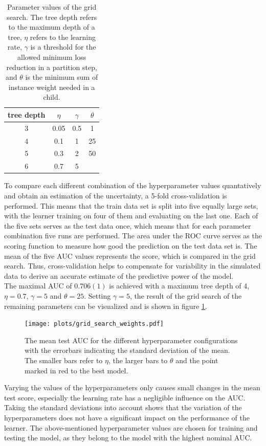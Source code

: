   \begin{table}
    \centering
    \begin{tabular}{c c c c}
      \toprule
      tree depth & $\eta$ & $\gamma$ & $\theta$ \\
      \midrule
      3 & 0.05 & 0.5 & 1  \\
      4 & 0.1  & 1   & 25  \\
      5 & 0.3  & 2 & 50  \\
      6 & 0.7  & 5   &  \\
    \end{tabular}
    \caption{Parameter values of the grid search. The tree depth refers to the maximum depth of a tree, $\eta$ refers to the learning rate,
    $\gamma$ is a threshold for the allowed minimum loss reduction in a partition step, and $\theta$ is the minimum sum of instance weight needed in a child.}
    \label{tab:grid}
  \end{table}
To compare each different combination of the hyperparameter values quantatively and obtain an estimation of the uncertainty, a 5-fold cross-validation is performed. This means that
the train data set is split into five equally
large sets, with the learner training on four of them and evaluating on the last one. Each of the five sets serves as the test data once, which means that for each
parameter combination five runs are performed. The area under the ROC curve serves as the scoring function to measure how good the prediction on the test data set is.
The mean of the five AUC values represents the score, which is compared in the grid search. Thus, cross-validation helps to compensate for variability in the simulated
data to derive an accurate estimate of the predictive power of the model. \\
The maximal AUC of $0.706(1)$ is achieved with a maximum tree depth of 4, $\eta=0.7$, $\gamma=5$ and $\theta=25$. Setting $\gamma=5$, the result of the grid search of the remaining
parameters can be visualized and is shown in figure \ref{fig:grid}.

\begin{figure}
  \centering
  \texttt{[image: plots/grid\_search\_weights.pdf]}
  \caption{The mean test AUC for the different hyperparameter configurations with the errorbars indicating the standard deviation of the mean. The
  smaller bars refer to $\eta$, the larger bars to $\theta$ and the point marked in red to the best model.}
  \label{fig:grid}
\end{figure}

Varying the values of the hyperparameters only causes small changes in the mean test score, especially the learning rate has a negligible influence on the AUC. Taking the
standard deviations into account shows that the variation of the hyperparameters does not have a significant impact on the performance of the learner.
The above-mentioned hyperparameter values are chosen for training and testing the model, as they belong to  the model with the highest nominal AUC.

